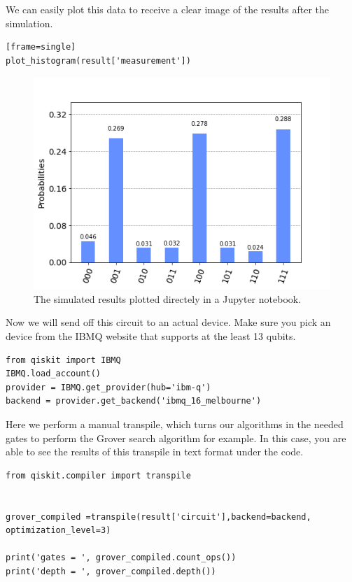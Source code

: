 We can easily plot this data to receive a clear image of the results after the simulation.

\begin{verbatim}[frame=single]
plot_histogram(result['measurement'])
\end{verbatim}

\begin{figure}
	\centering
	\includegraphics[scale = 0.75]{../Demonstration/img/simulated_3SAT.PNG}
	\caption{The simulated results plotted directely in a Jupyter notebook.}
\end{figure}

Now we will send off this circuit to an actual device. Make sure you pick an device from the IBMQ website that supports at the least 13 qubits.

\begin{verbatim}
from qiskit import IBMQ
IBMQ.load_account()
provider = IBMQ.get_provider(hub='ibm-q')
backend = provider.get_backend('ibmq_16_melbourne')
\end{verbatim}

Here we perform a manual transpile, which turns our algorithms in the needed gates to perform the Grover search algorithm for example. In this case, you are able to see the results of this transpile in text format under the code.

\begin{verbatim}
from qiskit.compiler import transpile


grover_compiled =transpile(result['circuit'],backend=backend, 
optimization_level=3)

print('gates = ', grover_compiled.count_ops())
print('depth = ', grover_compiled.depth())
\end{verbatim}

